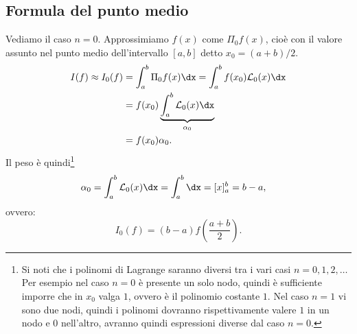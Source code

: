 \subsection{Formula del punto medio}

Vediamo il caso $n=0$. Approssimiamo $f( x)$ come $\Pi _{0} f( x)$, cioè con il valore assunto nel punto medio dell'intervallo $[ a,b]$ detto $x_{0} =(a+b)/2$.
\begin{align*}
I( f) \approx I_{0}( f) & =\int\nolimits ^{b}_{a} \Pi _{0} f( x) \dx=\int\nolimits ^{b}_{a} f( x_{0})\mathcal{L}_{0}( x) \dx\\
 & =f( x_{0})\underbrace{\int\nolimits ^{b}_{a}\mathcal{L}_{0}( x) \dx}_{\alpha _{0}}\\
 & =f( x_{0}) \alpha _{0}.
\end{align*}
Il peso è quindi\footnote{Si noti che i polinomi di Lagrange saranno diversi tra i vari casi $n=0,1,2,\dotsc $ Per esempio nel caso $n=0$ è presente un solo nodo, quindi è sufficiente imporre che in $x_{0}$ valga $1$, ovvero è il polinomio costante $1$. Nel caso $n=1$ vi sono due nodi, quindi i polinomi dovranno rispettivamente valere $1$ in un nodo e $0$ nell'altro, avranno quindi espressioni diverse dal caso $n=0$.}
\begin{align*}
\alpha _{0} & =\int\nolimits ^{b}_{a}\mathcal{L}_{0}( x) \dx=\int\nolimits ^{b}_{a} \dx=[ x]^{b}_{a} =b-a,
\end{align*}
ovvero:
\begin{equation*}
I_{0}( f) =( b-a) f\left(\frac{a+b}{2}\right).
\end{equation*}


